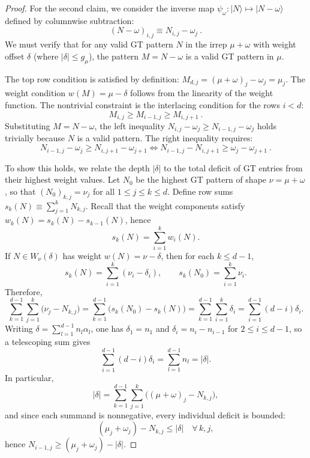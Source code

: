 \documentclass[11pt,letterpaper]{article}
\newcommand{\ket}[1]{| #1 \rangle}
\begin{document}
\begin{proof}
For the second claim, we consider the inverse map $\psi_\omega: \ket{N}\mapsto \ket{N-\omega}$ defined by columnwise subtraction:
\begin{equation}
 (N-\omega)_{i,j} \equiv N_{i,j} - \omega_j \ .
\end{equation}
We must verify that for any valid GT pattern $N$ in the irrep $\mu+\omega$ with weight offset $\delta$ (where $|\delta|\leq  g_\mu$), the pattern $M = N-\omega$ is a valid GT pattern in $\mu$.

The top row condition is satisfied by definition: $M_{d,j} = (\mu+\omega)_j - \omega_j = \mu_j$. The weight condition $w(M) = \mu-\delta$ follows from the linearity of the weight function. The nontrivial constraint is the interlacing condition for the rows $i < d$:
\begin{equation}
 M_{i,j} \geq M_{i-1,j} \geq M_{i,j+1} \ .
\end{equation}
Substituting $M = N-\omega$, the left inequality $N_{i,j}-\omega_j \geq N_{i-1,j}-\omega_j$ holds trivially because $N$ is a valid pattern. The right inequality requires:
\begin{equation}
N_{i-1,j} - \omega_j \geq N_{i,j+1} - \omega_{j+1} \iff N_{i-1,j} - N_{i,j+1} \geq \omega_j - \omega_{j+1} \ .
\end{equation}

To show this holds, we relate the depth $|\delta|$ to the total deficit of GT entries from their highest weight values. 
Let $N_0$ be the highest GT pattern of shape $\nu=\mu+\omega$, so that $(N_0)_{k,j}=\nu_j$ for all $1\le j\le k\le d$. 
Define row sums $s_k(N)\equiv\sum_{j=1}^k N_{k,j}$. Recall that the weight components satisfy $w_k(N)=s_k(N)-s_{k-1}(N)$, hence
\begin{equation}
s_k(N)=\sum_{i=1}^k w_i(N).
\end{equation}
If $N\in W_\nu(\delta)$ has weight $w(N)=\nu-\delta$, then for each $k\le d-1$,
\begin{equation}
s_k(N)=\sum_{i=1}^k (\nu_i-\delta_i), 
\qquad 
s_k(N_0)=\sum_{i=1}^k \nu_i.
\end{equation}
Therefore,
\begin{equation}
\sum_{k=1}^{d-1}\sum_{j=1}^k\big(\nu_j-N_{k,j}\big)=\sum_{k=1}^{d-1}\big(s_k(N_0)-s_k(N)\big)=\sum_{k=1}^{d-1}\sum_{i=1}^k\delta_i =\sum_{i=1}^{d-1}(d-i)\delta_i.
\end{equation}
Writing $\delta=\sum_{l=1}^{d-1}n_l\alpha_l$, one has
$\delta_1=n_1$ and $\delta_i=n_i-n_{i-1}$ for $2\le i\le d-1$, so a telescoping sum gives
\begin{equation}
\sum_{i=1}^{d-1}(d-i)\delta_i=\sum_{l=1}^{d-1}n_l=|\delta|.
\end{equation}
In particular,
\begin{equation}
|\delta|=\sum_{k=1}^{d-1}\sum_{j=1}^k\big((\mu+\omega)_j-N_{k,j}\big),
\end{equation}
and since each summand is nonnegative, every individual deficit is bounded:
\begin{equation}
(\mu_j+\omega_j)-N_{k,j}\le |\delta| \quad \forall\,k,j,
\end{equation}
hence $N_{i-1,j}\ge (\mu_j+\omega_j)-|\delta|$.


\end{proof}
\end{document}
